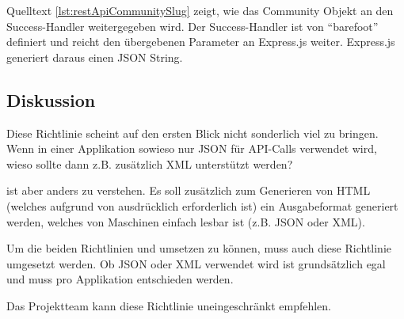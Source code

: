 Quelltext \ref{lst:restApiCommunitySlug} zeigt, wie das Community Objekt an den Success-Handler weitergegeben wird. Der Success-Handler ist von ``barefoot'' definiert und reicht den übergebenen Parameter an Express.js weiter. Express.js generiert daraus einen JSON String.

\subsection*{Diskussion}
Diese Richtlinie scheint auf den ersten Blick nicht sonderlich viel zu bringen. Wenn in einer Applikation sowieso nur JSON für API-Calls verwendet wird, wieso sollte dann z.B. zusätzlich XML unterstützt werden?

 ist aber anders zu verstehen. Es soll zusätzlich zum Generieren von HTML (welches aufgrund von  ausdrücklich erforderlich ist) ein Ausgabeformat generiert werden, welches von Maschinen einfach lesbar ist (z.B. JSON oder XML).

Um die beiden Richtlinien  und  umsetzen zu können, muss auch diese Richtlinie umgesetzt werden. Ob JSON oder XML verwendet wird ist grundsätzlich egal und muss pro Applikation entschieden werden.

Das Projektteam kann diese Richtlinie uneingeschränkt empfehlen.